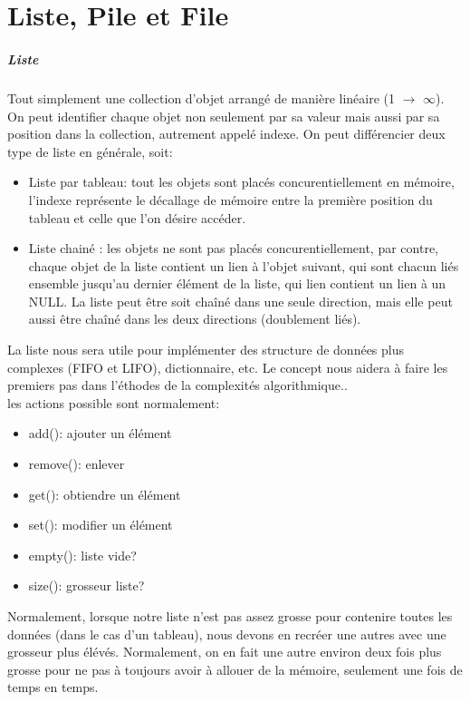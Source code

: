 \documentclass[oneside]{book}
\begin{document}
\chapter{Liste, Pile et File}
\paragraph{Liste} Tout simplement une collection d'objet arrangé de manière linéaire (1 $\rightarrow$ $\infty$). On peut identifier chaque objet non seulement par sa valeur mais aussi par sa position dans la collection, autrement appelé indexe. On peut différencier deux type de liste en générale, soit:
\begin{itemize}
\item Liste par tableau: tout les objets sont placés concurentiellement en mémoire, l'indexe représente le décallage de mémoire entre la première position du tableau et celle que l'on désire accéder.
\item Liste chainé : les objets ne sont pas placés concurentiellement, par contre, chaque objet de la liste contient un lien à l'objet suivant, qui sont chacun liés ensemble jusqu'au dernier élément de la liste, qui lien contient un lien à un NULL. La liste peut être soit chaîné dans une seule direction, mais elle peut aussi être chaîné dans les deux directions (doublement liés).
\end{itemize}

La liste nous sera utile pour implémenter des structure de données plus complexes (FIFO et LIFO), dictionnaire, etc. Le concept nous aidera à faire les premiers pas dans l'éthodes de la complexités algorithmique..\\

les actions possible sont normalement:
\begin{itemize}
\item add(): ajouter un élément
\item remove(): enlever
\item get(): obtiendre un élément
\item set(): modifier un élément
\item empty(): liste vide?
\item size(): grosseur liste?
\end{itemize}

Normalement, lorsque notre liste n'est pas assez grosse pour contenire toutes les données (dans le cas d'un tableau), nous devons en recréer une autres avec une grosseur plus élévés. Normalement, on en fait une autre  environ deux fois plus grosse pour ne pas à toujours avoir à allouer de la mémoire, seulement une fois de temps en temps.\\
\end{document}
